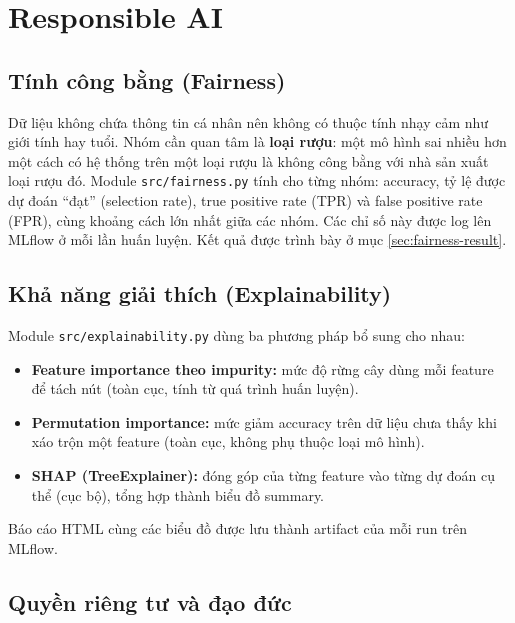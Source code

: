 \documentclass[12pt,a4paper]{report}
\begin{document}
\section{Responsible AI}

\subsection{Tính công bằng (Fairness)}

Dữ liệu không chứa thông tin cá nhân nên không có thuộc tính nhạy cảm như giới tính hay tuổi. Nhóm cần quan tâm là \textbf{loại rượu}: một mô hình sai nhiều hơn một cách có hệ thống trên một loại rượu là không công bằng với nhà sản xuất loại rượu đó. Module \texttt{src/fairness.py} tính cho từng nhóm: accuracy, tỷ lệ được dự đoán ``đạt'' (selection rate), true positive rate (TPR) và false positive rate (FPR), cùng khoảng cách lớn nhất giữa các nhóm. Các chỉ số này được log lên MLflow ở mỗi lần huấn luyện. Kết quả được trình bày ở mục \ref{sec:fairness-result}.

\subsection{Khả năng giải thích (Explainability)}

Module \texttt{src/explainability.py} dùng ba phương pháp bổ sung cho nhau:
\begin{itemize}
  \item \textbf{Feature importance theo impurity:} mức độ rừng cây dùng mỗi feature để tách nút (toàn cục, tính từ quá trình huấn luyện).
  \item \textbf{Permutation importance:} mức giảm accuracy trên dữ liệu chưa thấy khi xáo trộn một feature (toàn cục, không phụ thuộc loại mô hình).
  \item \textbf{SHAP (TreeExplainer):} đóng góp của từng feature vào từng dự đoán cụ thể (cục bộ), tổng hợp thành biểu đồ summary.
\end{itemize}

Báo cáo HTML cùng các biểu đồ được lưu thành artifact của mỗi run trên MLflow.

\subsection{Quyền riêng tư và đạo đức}
\end{document}
